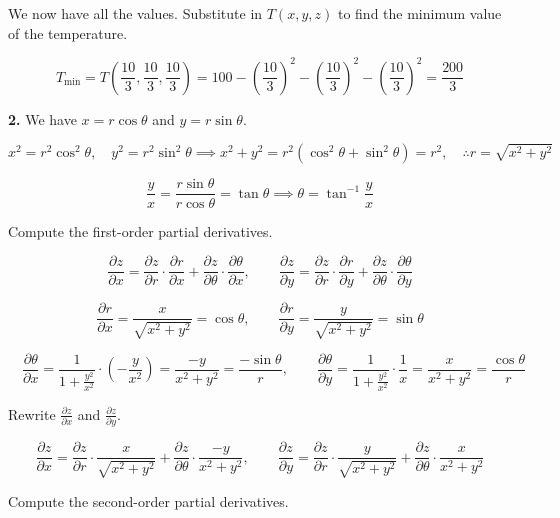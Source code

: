 \documentclass{article}
\begin{document}
We now have all the values. Substitute in $T(x,y,z)$ to find the minimum value of the temperature.

\[T_{\text{min}}=T\left(\frac{10}{3},\frac{10}{3},\frac{10}{3}\right)=100-\left(\frac{10}{3}\right)^2-\left(\frac{10}{3}\right)^2-\left(\frac{10}{3}\right)^2=\boxed{\frac{200}{3}}\]

\vspace{1em}

\textbf{2.} We have $x=r\cos\theta$ and $y=r\sin\theta$.

\[x^2=r^2\cos^2\theta,\quad y^2 =r^2\sin^2\theta\implies x^2+y^2=r^2\left(\cos^2\theta+\sin^2\theta\right)=r^2, \quad \therefore  r=\sqrt{x^2+y^2}\]

\[\frac{y}{x}=\frac{r\sin\theta}{r\cos\theta}=\tan\theta \implies \theta=\tan^{-1}\frac{y}{x}\]

Compute the first-order partial derivatives.

\[\frac{\partial z}{\partial x}=\frac{\partial z}{\partial r}\cdot\frac{\partial r}{\partial x}+\frac{\partial z}{\partial \theta}\cdot\frac{\partial\theta}{\partial x},\quad\quad\frac{\partial z}{\partial y}=\frac{\partial z}{\partial r}\cdot\frac{\partial r}{\partial y} + \frac{\partial z}{\partial\theta}\cdot\frac{\partial\theta}{\partial y}\]

\[\frac{\partial r}{\partial x}=\frac{x}{\sqrt{x^2+y^2}}=\cos\theta,\quad\quad\frac{\partial r}{\partial y}=\frac{y}{\sqrt{x^2+y^2}}=\sin\theta\]

\newpage

\[\quad\frac{\partial\theta}{\partial x}=\frac{1}{\displaystyle 1+\frac{y^2}{x^2}}\cdot \left(-\frac{y}{x^2}\right)=\frac{-y}{x^2+y^2}=\frac{-\sin\theta}{r},\quad\quad\frac{\partial\theta}{\partial y}=\frac{1}{\displaystyle1+\frac{y^2}{x^2}}\cdot\frac{1}{x}=\frac{x}{x^2+y^2}=\frac{\cos\theta}{r}\]

Rewrite $\displaystyle\frac{\partial z}{\partial x}$ and $\displaystyle\frac{\partial z}{\partial y}$.

\[\frac{\partial z}{\partial x}=\frac{\partial z}{\partial r}\cdot\frac{x}{\sqrt{x^2+y^2}}+\frac{\partial z}{\partial\theta}\cdot\frac{-y}{x^2+y^2},\quad\quad\frac{\partial z}{\partial y}=\frac{\partial z}{\partial r}\cdot\frac{y}{\sqrt{x^2+y^2}}+\frac{\partial z}{\partial \theta}\cdot\frac{x}{x^2+y^2}\]

Compute the second-order partial derivatives.
\end{document}
